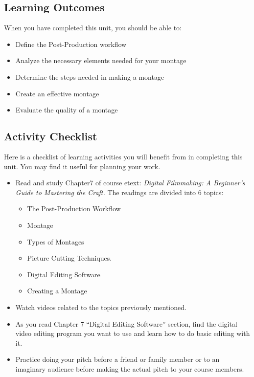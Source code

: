 \documentclass[
]{book}
\providecommand{\tightlist}{%
  \setlength{\itemsep}{0pt}\setlength{\parskip}{0pt}}
\begin{document}
\hypertarget{learning-outcomes-6}{%
\subsection*{Learning Outcomes}\label{learning-outcomes-6}}

When you have completed this unit, you should be able to:

\begin{itemize}
\tightlist
\item
  Define the Post-Production workflow
\item
  Analyze the necessary elements needed for your montage
\item
  Determine the steps needed in making a montage
\item
  Create an effective montage
\item
  Evaluate the quality of a montage
\end{itemize}

\hypertarget{activity-checklist-6}{%
\subsection*{Activity Checklist}\label{activity-checklist-6}}

\begin{reflect}
Here is a checklist of learning activities you will benefit from in completing this unit. You may find it useful for planning your work.

\begin{itemize}
\item
  Read and study Chapter7 of course etext: \emph{Digital Filmmaking: A Beginner's Guide to Mastering the Craft.} The readings are divided into 6 topics:

  \begin{itemize}
  \tightlist
  \item
    The Post-Production Workflow
  \item
    Montage
  \item
    Types of Montages
  \item
    Picture Cutting Techniques.
  \item
    Digital Editing Software
  \item
    Creating a Montage
  \end{itemize}
\item
  Watch videos related to the topics previously mentioned.
\item
  As you read Chapter 7 ``Digital Editing Software'' section, find the digital video editing program you want to use and learn how to do basic editing with it.
\item
  Practice doing your pitch before a friend or family member or to an imaginary audience before making the actual pitch to your course members.
\end{itemize}
\end{reflect}
\end{document}
